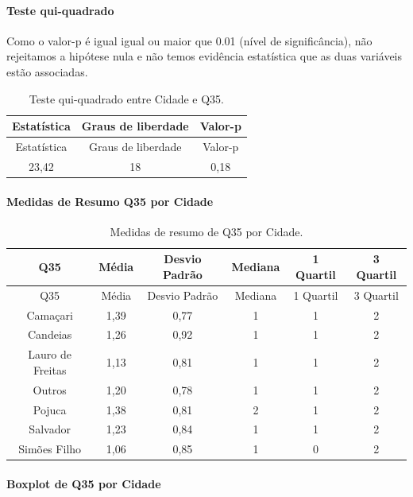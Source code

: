 \documentclass[]{article}
\let\oldparagraph\paragraph
\renewcommand{\paragraph}[1]{\oldparagraph{#1}\mbox{}}
\begin{document}
\hypertarget{teste-qui-quadrado-107}{%
\paragraph{Teste qui-quadrado}\label{teste-qui-quadrado-107}}

Como o valor-p é igual igual ou maior que 0.01 (nível de significância), não rejeitamos a hipótese nula e não temos evidência estatística que as duas variáveis estão associadas.

\begin{longtable}[]{@{}ccc@{}}
\caption{\label{tab:unnamed-chunk-1255}Teste qui-quadrado entre Cidade e Q35.}\tabularnewline
\toprule
Estatística & Graus de liberdade & Valor-p\tabularnewline
\midrule
\endfirsthead
\toprule
Estatística & Graus de liberdade & Valor-p\tabularnewline
\midrule
\endhead
23,42 & 18 & 0,18\tabularnewline
\bottomrule
\end{longtable}

\cleardoublepage

\hypertarget{medidas-de-resumo-q35-por-cidade}{%
\paragraph{Medidas de Resumo Q35 por Cidade}\label{medidas-de-resumo-q35-por-cidade}}

\begin{longtable}[]{@{}cccccc@{}}
\caption{\label{tab:unnamed-chunk-1256}Medidas de resumo de Q35 por Cidade.}\tabularnewline
\toprule
Q35 & Média & Desvio Padrão & Mediana & 1 Quartil & 3 Quartil\tabularnewline
\midrule
\endfirsthead
\toprule
Q35 & Média & Desvio Padrão & Mediana & 1 Quartil & 3 Quartil\tabularnewline
\midrule
\endhead
Camaçari & 1,39 & 0,77 & 1 & 1 & 2\tabularnewline
Candeias & 1,26 & 0,92 & 1 & 1 & 2\tabularnewline
Lauro de Freitas & 1,13 & 0,81 & 1 & 1 & 2\tabularnewline
Outros & 1,20 & 0,78 & 1 & 1 & 2\tabularnewline
Pojuca & 1,38 & 0,81 & 2 & 1 & 2\tabularnewline
Salvador & 1,23 & 0,84 & 1 & 1 & 2\tabularnewline
Simões Filho & 1,06 & 0,85 & 1 & 0 & 2\tabularnewline
\bottomrule
\end{longtable}

\hypertarget{boxplot-de-q35-por-cidade}{%
\paragraph{Boxplot de Q35 por Cidade}\label{boxplot-de-q35-por-cidade}}
\end{document}
